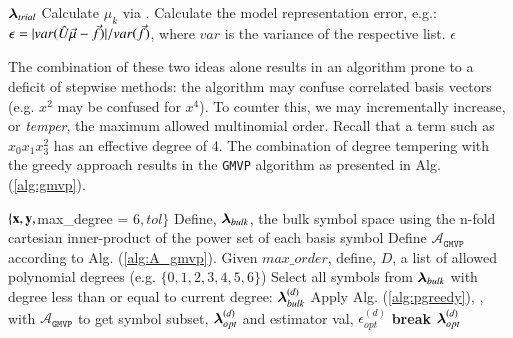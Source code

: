 \documentclass[twocolumn,aps,prd,floatfix,preprintnumbers,a4paper,nofootinbib,
superscriptaddress,10pt]{revtex4-1}
\def\gmvp#1{greedy-multivariate-polynomial#1
  (\texttt{GMVP}#1)\gdef\gmvp{\texttt{GMVP}}}
\begin{document}
{\scriptsize
\begin{algorithm}[H]
  \caption{$\mathcal{A}_{\gmvp}$, the action for \gmvp. Model calculation given basis symbols, and output of model error estimate.}
  \label{alg:A_gmvp}
  \begin{algorithmic}[1]
     ${\bm{\lambda}}_{trial}$
    \vskip 10pt
    \State Calculate $\mu_k$ via .
    \State Calculate the model representation error, e.g.: $\epsilon = |var(\hat{U} \vec{\mu} - \vec{f})|/var(\vec{f})$, where $var$ is the variance of the respective list.
    \vskip 10pt
     $\epsilon$
  \end{algorithmic}
\end{algorithm}
}
%
\par The combination of these two ideas alone results in an algorithm prone to a deficit of stepwise methods: the algorithm may confuse correlated basis vectors (e.g. $x^2$ may be confused for $x^4$).
%
To counter this, we may incrementally increase, or \textit{temper}, the maximum allowed multinomial order.
%
Recall that a term such as $x_0x_1x_3^2$ has an effective degree of 4.
%
The combination of degree tempering with the greedy approach results in the \gmvp{} algorithm as presented in Alg. (\ref{alg:gmvp}).
%
\hspace{1cm}
{\scriptsize
\begin{algorithm}[H]
  \caption{\gmvp{}, a degree tempered stepwise algorithm for multivariate polynomial modeling of scalar data.}
  \label{alg:gmvp}
  \begin{algorithmic}[1]
     $ \{ \bf{x}, \bf{y}, $max\_degree = 6$, tol \}$
    \vskip 10pt
    \State Define, ${\bm{\lambda}}_{bulk}$, the bulk symbol space using the n-fold cartesian inner-product of the power set of each basis symbol
    \State Define $\mathcal{A}_{\gmvp{}}$ according to Alg. (\ref{alg:A_gmvp}).
    \State Given $max\_order$, define, ${ D}$, a list of allowed polynomial degrees (e.g. $\{0,1,2,3,4,5,6\}$)
      \State Select all symbols from ${\bm{\lambda}}_{bulk}$ with degree less than or equal to current degree: ${\bm{\lambda}}^{(d)}_{bulk}$
      \State Apply Alg. (\ref{alg:pgreedy}), \pgreedy{}, with $\mathcal{A}_{\gmvp{}}$ to get symbol subset, ${\bm{\lambda}}^{(d)}_{opt}$ and estimator val, $\epsilon^{(d)}_{opt}$
        \State \textbf{break}
      \EndIf
    \EndFor
    \vskip 10pt
     ${\bm{\lambda}}^{(d)}_{opt}$
  \end{algorithmic}
\end{algorithm}
}
%
%
\end{document}
